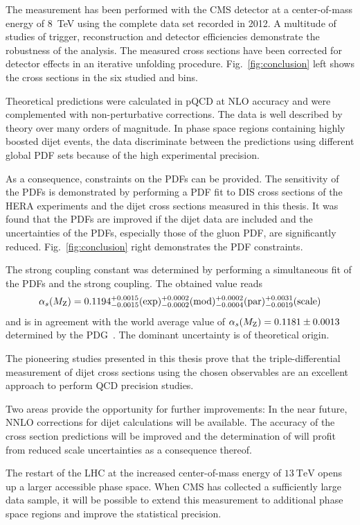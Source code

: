 The measurement has been performed with the CMS detector at a center-of-mass
energy of \SI{8}{\TeV} using the complete data set recorded in 2012. A multitude
of studies of trigger, reconstruction and detector efficiencies demonstrate the
robustness of the analysis. The measured cross sections have been corrected for
detector effects in an iterative unfolding procedure. Fig.~\ref{fig:conclusion}
left shows the cross sections in the six studied \ystar and \yboost bins.

Theoretical predictions were calculated in pQCD at NLO accuracy and were
complemented with non-perturbative corrections. The data is well
described by theory over many orders of magnitude. In phase space regions
containing highly boosted dijet events, the data discriminate between the
predictions using different global PDF sets because of the high experimental
precision.

As a consequence, constraints on the PDFs can be provided. The sensitivity of
the PDFs is demonstrated by performing a PDF fit to DIS cross sections of the
HERA experiments and the dijet cross sections measured in this thesis. It was
found that the PDFs are improved if the dijet data are included and the
uncertainties of the PDFs, especially those of the gluon PDF, are
significantly reduced. Fig.~\ref{fig:conclusion} right demonstrates the PDF
constraints.

The strong coupling constant \asmz was determined by performing a simultaneous
fit of the PDFs and the strong coupling. The obtained value reads
%
\begin{equation*}
  \alpha_{s}(M_\mathrm{Z}) = 0.1194_{-0.0015}^{+0.0015}(\mathrm{exp})_{-0.0002}^{+0.0002}(\mathrm{mod})_{-0.0004}^{+0.0002}(\mathrm{par})_{-0.0019}^{+0.0031}(\mathrm{scale})
\end{equation*}
%
and is in agreement with the world average value of $\alpha_{s}(M_\mathrm{Z}) = 0.1181 \pm
0.0013$ determined by the PDG~\cite{Agashe:2014kda}. The dominant uncertainty is
of theoretical origin.

The pioneering studies presented in this thesis prove that the triple-differential
measurement of dijet cross sections using the chosen observables are an
excellent approach to perform QCD precision studies.

Two areas provide the opportunity for further improvements: In the near future,
NNLO corrections for dijet calculations will be available. The accuracy of the
cross section predictions will be improved and the determination of
\asmz will profit from reduced scale uncertainties as a consequence thereof. 

The restart of the LHC at the increased center-of-mass energy of $\SI{13}{\TeV}$
opens up a larger accessible phase space. When CMS has collected a sufficiently
large data sample, it will be possible to extend this measurement to additional
phase space regions and improve the statistical precision.

